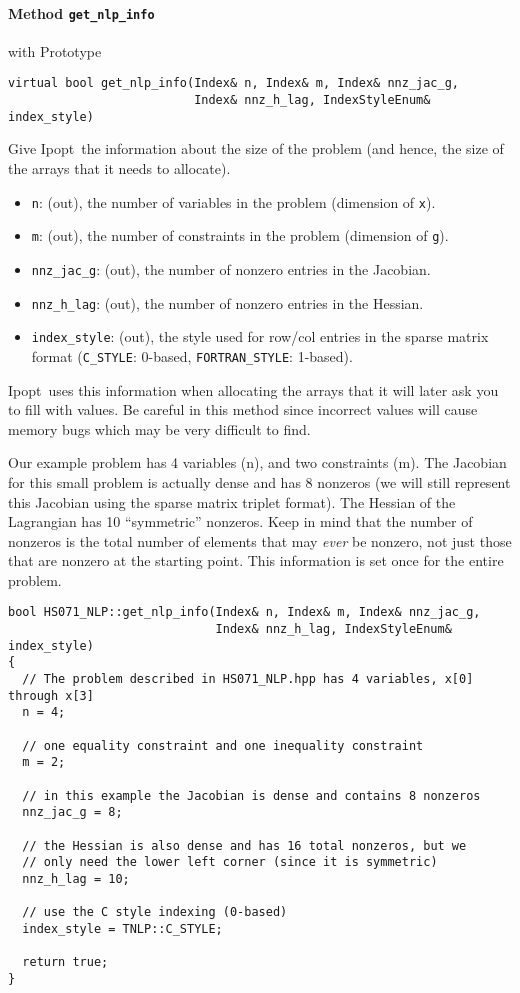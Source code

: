 \documentclass[letter,10pt]{article}
\newcommand{\Ipopt}{{\sc Ipopt}}
\begin{document}
\paragraph{Method {\texttt{get\_nlp\_info}}} with Prototype
\begin{verbatim}
virtual bool get_nlp_info(Index& n, Index& m, Index& nnz_jac_g,
                          Index& nnz_h_lag, IndexStyleEnum& index_style)
\end{verbatim}
Give \Ipopt\ the information about the size of the problem (and hence,
the size of the arrays that it needs to allocate). 
\begin{itemize}
\item {\tt n}: (out), the number of variables in the problem (dimension of {\tt x}).
\item {\tt m}: (out), the number of constraints in the problem (dimension of {\tt g}).
\item {\tt nnz\_jac\_g}: (out), the number of nonzero entries in the Jacobian.
\item {\tt nnz\_h\_lag}: (out), the number of nonzero entries in the Hessian.
\item {\tt index\_style}: (out), the style used for row/col entries in the sparse matrix
format ({\tt C\_STYLE}: 0-based, {\tt FORTRAN\_STYLE}: 1-based).
\end{itemize}
\Ipopt\ uses this information when allocating the arrays that
it will later ask you to fill with values. Be careful in this method
since incorrect values will cause memory bugs which may be very
difficult to find.

Our example problem has 4 variables (n), and two constraints (m). The
Jacobian for this small problem is actually dense and has 8 nonzeros
(we will still represent this Jacobian using the sparse matrix triplet
format). The Hessian of the Lagrangian has 10 ``symmetric'' nonzeros.
Keep in mind that the number of nonzeros is the total number of
elements that may \emph{ever} be nonzero, not just those that are
nonzero at the starting point. This information is set once for the
entire problem.

\begin{footnotesize}
\begin{verbatim}
bool HS071_NLP::get_nlp_info(Index& n, Index& m, Index& nnz_jac_g, 
                             Index& nnz_h_lag, IndexStyleEnum& index_style)
{
  // The problem described in HS071_NLP.hpp has 4 variables, x[0] through x[3]
  n = 4;

  // one equality constraint and one inequality constraint
  m = 2;

  // in this example the Jacobian is dense and contains 8 nonzeros
  nnz_jac_g = 8;

  // the Hessian is also dense and has 16 total nonzeros, but we
  // only need the lower left corner (since it is symmetric)
  nnz_h_lag = 10;

  // use the C style indexing (0-based)
  index_style = TNLP::C_STYLE;

  return true;
}
\end{verbatim}
\end{footnotesize}
\end{document}
